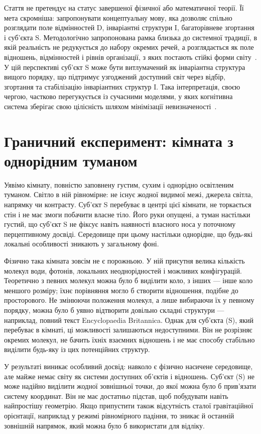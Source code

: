 \documentclass[aps,prd,onecolumn,nofootinbib,superscriptaddress]{revtex4-2} %
\begin{document}
    Стаття не претендує на статус завершеної фізичної або математичної теорії. Її мета скромніша: запропонувати концептуальну мову, яка дозволяє спільно розглядати поле відмінностей D, інваріантні структури I, багаторівневе згортання і суб’єкта S. Методологічно запропонована рамка близька до системної традиції, в якій реальність не редукується до набору окремих речей, а розглядається як поле відношень, відмінностей і рівнів організації, з яких постають стійкі форми світу~\cite{Bateson1972}. У цій перспективі суб’єкт S може бути витлумачений як інваріантна структура вищого порядку, що підтримує узгоджений доступний світ через відбір, згортання та стабілізацію інваріантних структур I. Така інтерпретація, своєю чергою, частково перегукується із сучасними моделями, у яких когнітивна система зберігає свою цілісність шляхом мінімізації невизначеності~\cite{Friston2010}.


    \section{Граничний експеримент: кімната з однорідним туманом}
    Уявімо кімнату, повністю заповнену густим, сухим і однорідно освітленим туманом. Світло в ній рівномірне: не існує жодної видимої межі, джерела світла, напрямку чи контрасту. Суб’єкт S перебуває в центрі цієї кімнати, не торкається стін і не має змоги побачити власне тіло. Його руки опущені, а туман настільки густий, що суб’єкт S не фіксує навіть наявності власного носа у поточному перцептивному досвіді. Середовище при цьому настільки однорідне, що будь-які локальні особливості зникають у загальному фоні.

    Фізично така кімната зовсім не є порожньою. У ній присутня велика кількість молекул води, фотонів, локальних неоднорідностей і можливих конфігурацій. Теоретично з певних молекул можна було б виділити коло, з інших — інше коло меншого розміру; їхнє порівняння могло б створити відношення, подібне до просторового. Не змінюючи положення молекул, а лише вибираючи їх у певному порядку, можна було б уявно відтворити довільно складні структури — наприклад, повний текст Encyclopaedia Britannica. Однак для суб’єкта (S), який перебуває в кімнаті, ці можливості залишаються недоступними. Він не розрізняє окремих молекул, не бачить їхніх взаємних відношень і не має способу стабільно виділити будь-яку із цих потенційних структур.

    У результаті виникає особливий досвід: навколо є фізично насичене середовище, але майже немає світу як системи доступних об’єктів і відношень. Суб’єкт (S) не може надійно виділити жодної зовнішньої точки, до якої можна було б прив’язати систему координат. Він не має достатньо підстав, щоб побудувати навіть найпростішу геометрію. Якщо припустити також відсутність сталої гравітаційної орієнтації, наприклад у режимі рівномірного падіння, то зникає й останній зовнішній напрямок, який можна було б використати для відліку.
\end{document}
